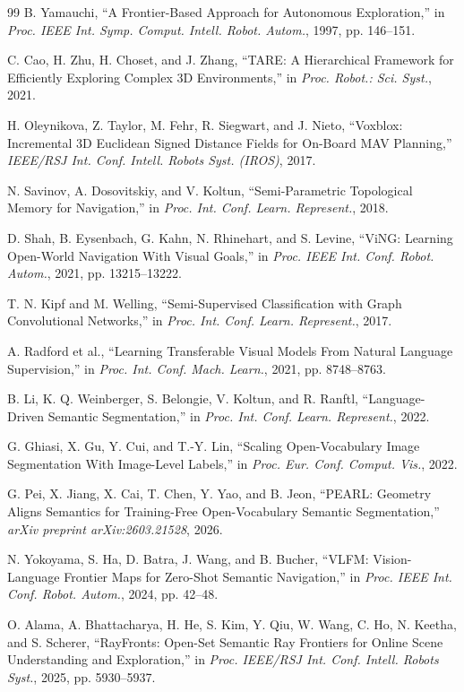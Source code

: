 \documentclass[letterpaper,10pt,conference]{ieeeconf}
\begin{document}
{\begin{thebibliography}{99}
B. Yamauchi,
``A Frontier-Based Approach for Autonomous Exploration,'' in \emph{Proc.
IEEE Int. Symp. Comput. Intell. Robot. Autom.}, 1997, pp. 146--151.

C. Cao, H. Zhu, H. Choset, and J. Zhang,
``TARE: A Hierarchical Framework for Efficiently Exploring Complex 3D
Environments,'' in \emph{Proc. Robot.: Sci. Syst.}, 2021.

H. Oleynikova, Z. Taylor, M. Fehr, R. Siegwart, and J. Nieto,
``Voxblox: Incremental 3D Euclidean Signed Distance Fields for On-Board MAV
Planning,'' \emph{IEEE/RSJ Int. Conf. Intell. Robots Syst. (IROS)}, 2017.

N. Savinov, A. Dosovitskiy, and V. Koltun,
``Semi-Parametric Topological Memory for Navigation,'' in \emph{Proc. Int.
Conf. Learn. Represent.}, 2018.

D. Shah, B. Eysenbach, G. Kahn, N. Rhinehart, and S. Levine,
``ViNG: Learning Open-World Navigation With Visual Goals,'' in \emph{Proc.
IEEE Int. Conf. Robot. Autom.}, 2021, pp. 13215--13222.

T. N. Kipf and M. Welling,
``Semi-Supervised Classification with Graph Convolutional Networks,''
in \emph{Proc. Int. Conf. Learn. Represent.}, 2017.

A. Radford et al.,
``Learning Transferable Visual Models From Natural Language Supervision,''
in \emph{Proc. Int. Conf. Mach. Learn.}, 2021, pp. 8748--8763.

B. Li, K. Q. Weinberger, S. Belongie, V. Koltun, and R. Ranftl,
``Language-Driven Semantic Segmentation,'' in \emph{Proc. Int. Conf. Learn.
Represent.}, 2022.

G. Ghiasi, X. Gu, Y. Cui, and T.-Y. Lin,
``Scaling Open-Vocabulary Image Segmentation With Image-Level Labels,'' in
\emph{Proc. Eur. Conf. Comput. Vis.}, 2022.

G. Pei, X. Jiang, X. Cai, T. Chen, Y. Yao, and B. Jeon,
``PEARL: Geometry Aligns Semantics for Training-Free Open-Vocabulary Semantic
Segmentation,'' \emph{arXiv preprint arXiv:2603.21528}, 2026.

N. Yokoyama, S. Ha, D. Batra, J. Wang, and B. Bucher,
``VLFM: Vision-Language Frontier Maps for Zero-Shot Semantic Navigation,''
in \emph{Proc. IEEE Int. Conf. Robot. Autom.}, 2024, pp. 42--48.

O. Alama, A. Bhattacharya, H. He, S. Kim, Y. Qiu, W. Wang, C. Ho, N. Keetha,
and S. Scherer,
``RayFronts: Open-Set Semantic Ray Frontiers for Online Scene Understanding
and Exploration,'' in \emph{Proc. IEEE/RSJ Int. Conf. Intell. Robots Syst.},
2025, pp. 5930--5937.


\end{thebibliography}}
\end{document}
